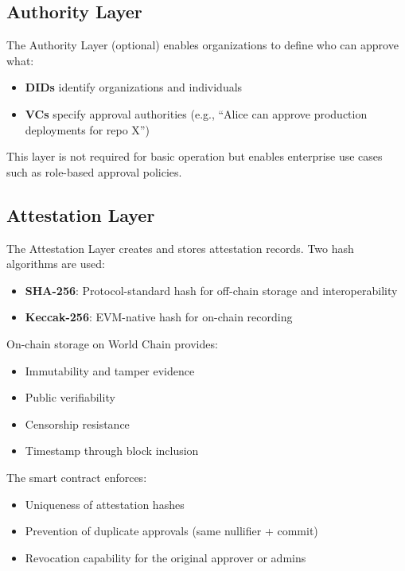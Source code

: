 \documentclass[conference]{IEEEtran}
\begin{document}
\subsection{Authority Layer}

The Authority Layer (optional) enables organizations to define who can approve what:

\begin{itemize}
    \item \textbf{DIDs} identify organizations and individuals
    \item \textbf{VCs} specify approval authorities (e.g., ``Alice can approve production deployments for repo X'')
\end{itemize}

This layer is not required for basic operation but enables enterprise use cases such as role-based approval policies.

\subsection{Attestation Layer}

The Attestation Layer creates and stores attestation records. Two hash algorithms are used:

\begin{itemize}
    \item \textbf{SHA-256}: Protocol-standard hash for off-chain storage and interoperability
    \item \textbf{Keccak-256}: EVM-native hash for on-chain recording
\end{itemize}

On-chain storage on World Chain provides:
\begin{itemize}
    \item Immutability and tamper evidence
    \item Public verifiability
    \item Censorship resistance
    \item Timestamp through block inclusion
\end{itemize}

The smart contract enforces:
\begin{itemize}
    \item Uniqueness of attestation hashes
    \item Prevention of duplicate approvals (same nullifier + commit)
    \item Revocation capability for the original approver or admins
\end{itemize}
\end{document}
